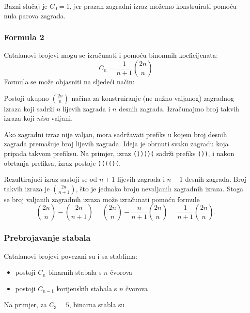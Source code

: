 Bazni slučaj je $C_0=1$,
jer prazan zagradni izraz
možemo konstruirati pomoću nula parova zagrada.

\subsubsection{Formula 2}

Catalanovi brojevi mogu se izračunati
i pomoću binomnih koeficijenata:
\[ C_n = \frac{1}{n+1} {2n \choose n}\]
Formula se može objasniti na sljedeći način:

Postoji ukupno ${2n \choose n}$ načina
za konstruiranje (ne nužno valjanog)
zagradnog izraza koji sadrži $n$ lijevih
zagrada i $n$ desnih zagrada.
Izračunajmo broj takvih
izraza koji \emph{nisu} valjani.

Ako zagradni izraz nije valjan,
mora sadržavati prefiks u kojem
broj desnih zagrada premašuje
broj lijevih zagrada.
Ideja je obrnuti svaku zagradu
koja pripada takvom prefiksu.
Na primjer, izraz
\texttt{())()(} sadrži prefiks \texttt{())},
i nakon obrtanja prefiksa,
izraz postaje \texttt{)((()(}.

Rezultirajući izraz sastoji se od $n+1$
lijevih zagrada i $n-1$ desnih zagrada.
Broj takvih izraza je ${2n \choose n+1}$,
što je jednako broju nevaljanih
zagradnih izraza.
Stoga se broj valjanih zagradnih
izraza može izračunati pomoću formule
\[{2n \choose n}-{2n \choose n+1} = {2n \choose n} - \frac{n}{n+1} {2n \choose n} = \frac{1}{n+1} {2n \choose n}.\]

\subsubsection{Prebrojavanje stabala}

Catalanovi brojevi povezani su i sa stablima:

\begin{itemize}
\item postoji $C_n$ binarnih stabala s $n$ čvorova
\item postoji $C_{n-1}$ korijenskih stabala s $n$ čvorova
\end{itemize}
\noindent
Na primjer, za $C_3=5$, binarna stabla su

